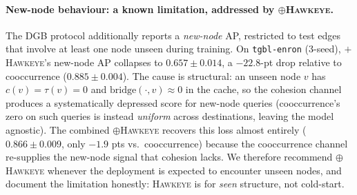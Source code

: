 \documentclass[sigconf,nonacm,review]{acmart}
\newcommand{\method}{\textsc{Hawkeye}\xspace}
\begin{document}
\paragraph{New-node behaviour: a known limitation, addressed by $\oplus$\method.}
The DGB protocol additionally reports a \emph{new-node} AP, restricted to
test edges that involve at least one node unseen during training. On
\texttt{tgbl-enron} (3-seed), $+$\method's new-node AP collapses to
$0.657\!\pm\!0.014$, a $-22.8$-pt drop relative to cooccurrence
($0.885\!\pm\!0.004$). The cause is structural: an unseen node $v$ has
$c(v)=\tau(v)=0$ and $\mathrm{bridge}(\cdot,v)\!\approx\!0$ in the cache,
so the cohesion channel produces a systematically depressed score for
new-node queries (cooccurrence's zero on such queries is instead
\emph{uniform} across destinations, leaving the model agnostic). The
combined $\oplus$\method recovers this loss almost entirely
($0.866\!\pm\!0.009$, only $-1.9$ pts vs.\ cooccurrence) because the
cooccurrence channel re-supplies the new-node signal that cohesion lacks.
We therefore recommend $\oplus$\method whenever the deployment is expected
to encounter unseen nodes, and document the limitation honestly: \method
is for \emph{seen} structure, not cold-start.
\end{document}
